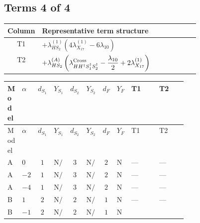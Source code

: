 \documentclass[8pt]{article}
\begin{document}
\begin{landscape}
\subsection*{Terms 4 of 4}
\begin{center}
\begin{tabular}{@{}c >{\raggedright\arraybackslash}p{0.82\linewidth}@{}}
\toprule
Column & Representative term structure \\
\midrule
T1 & \(\displaystyle +{\lambda_{HS_2}^{(1)}} (4 {\lambda_{X_{17}}^{(1)}}-6 {\lambda_{10}})\) \\
\midrule
T2 & \(\displaystyle +{\lambda_{HS_2}^{(A)}} \left({\lambda_{H H^\dagger S_1^\dagger S_2^\dagger}^{\rm Cross}}-\frac{{\lambda_{10}}}{2}+2 {\lambda_{X_{17}}^{(1)}}\right)\) \\
\midrule
\bottomrule
\end{tabular}
\end{center}
\smallskip
\tiny
\begin{longtable}{@{}llcccccc >{\raggedright\arraybackslash}p{0.21\linewidth} >{\raggedright\arraybackslash}p{0.21\linewidth}@{}}
\toprule
Model & $\alpha$ & $d_{S_1}$ & $Y_{S_1}$ & $d_{S_2}$ & $Y_{S_2}$ & $d_F$ & $Y_F$ & T1 & T2 \\
\midrule
\endfirsthead
\toprule
Model & $\alpha$ & $d_{S_1}$ & $Y_{S_1}$ & $d_{S_2}$ & $Y_{S_2}$ & $d_F$ & $Y_F$ & T1 & T2 \\
\midrule
\endhead
A & $0$ & $1$ & $\text{N/A}$ & $3$ & $\text{N/A}$ & $2$ & $\text{N/A}$ & --- & --- \\
\midrule
A & $-2$ & $1$ & $\text{N/A}$ & $3$ & $\text{N/A}$ & $2$ & $\text{N/A}$ & --- & --- \\
\midrule
A & $-4$ & $1$ & $\text{N/A}$ & $3$ & $\text{N/A}$ & $2$ & $\text{N/A}$ & --- & --- \\
\midrule
B & $1$ & $2$ & $\text{N/A}$ & $2$ & $\text{N/A}$ & $1$ & $\text{N/A}$ & --- & --- \\
\midrule
B & $-1$ & $2$ & $\text{N/A}$ & $2$ & $\text{N/A}$ & $1$ & $\text{N/A}$ & \scriptsize\adjustbox{max width=\linewidth}{$\begin{gathered} +{\lambda_{HS_2}^{(1)}} (4 {\lambda_{X_{17}}^{(1)}}-6 {\lambda_{10}})\end{gathered}$} & \scriptsize\adjustbox{max width=\linewidth}{$\begin{gathered} +{\lambda_{HS_2}^{(A)}} \left({\lambda_{H H^\dagger S_1^\dagger S_2^\dagger}^{\rm Cross}}-\frac{{\lambda_{10}}}{2}+2 {\lambda_{X_{17}}^{(1)}}\right)\end{gathered}$} \\

\end{longtable}
\end{landscape}
\end{document}
